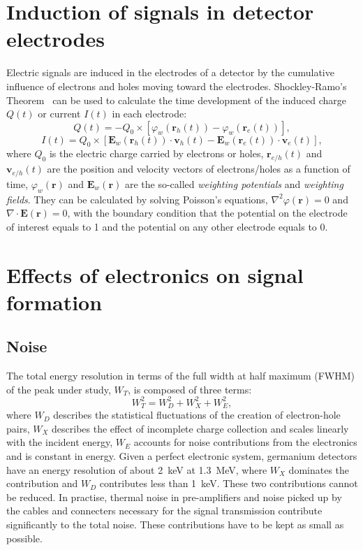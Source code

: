 \section{Induction of signals in detector electrodes}
\label{sec:det:ramo}
Electric signals are induced in the electrodes of a detector by the cumulative influence of electrons and holes moving toward the electrodes. Shockley-Ramo's Theorem~\cite{Gat82, Rad88, He00} can be used to calculate the time development of the induced charge $Q(t)$ or current $I(t)$ in each electrode:
\begin{equation} 
  \label{eq:det:ramoq}
  Q(t) = -Q_{0} \times [\varphi_{w}(\mathbf{r}_{h}(t)) - \varphi_{w}(\mathbf{r}_{e}(t))],
\end{equation}
\begin{equation} 
  \label{eq:det:ramoi}
  I(t) = Q_{0} \times [\mathbf{E}_{w}(\mathbf{r}_{h}(t)) \cdot \mathbf{v}_{h}(t) - \mathbf{E}_{w}(\mathbf{r}_{e}(t)) \cdot \mathbf{v}_{e}(t)],
\end{equation}
where $Q_{0}$ is the electric charge carried by electrons or holes, $\mathbf{r}_{e/h}(t)$ and $\mathbf{v}_{e/h}(t)$ are the position and velocity vectors of electrons/holes as a function of time, $\varphi_{w}(\mathbf{r})$ and $\mathbf{E}_{w}(\mathbf{r})$ are the so-called \emph{weighting potentials} and \emph{weighting fields}. They can be calculated by solving Poisson's equations, $\nabla^{2} \varphi(\mathbf{r}) = 0$ and $\nabla \cdot \mathbf{E}(\mathbf{r}) = 0$, with the boundary condition that the potential on the electrode of interest equals to 1 and the potential on any other electrode equals to 0.

\section{Effects of electronics on signal formation}
\label{sec:det:elec}

\subsection{Noise}
\label{sec:det:noise}
The total energy resolution in terms of the full width at half maximum
(FWHM) of the peak under study, $W_{T}$, is composed of three terms:
\begin{equation}
W_{T}^{2} = W_{D}^{2} + W_{X}^{2} + W_{E}^{2},
\end{equation}
where $W_{D}$ describes the statistical fluctuations of the creation of electron-hole pairs, $W_{X}$ describes the effect of incomplete charge collection and scales linearly with the incident energy, $W_{E}$ accounts for noise contributions from the electronics and is constant in energy. Given a perfect electronic system, germanium detectors have an energy resolution of about 2~keV at 1.3~MeV, where $W_{X}$ dominates the contribution and $W_{D}$ contributes less than 1~keV. These two contributions cannot be reduced. In practise, thermal noise in pre-amplifiers and noise picked up by the cables and connecters necessary for the signal transmission contribute significantly to the total noise. These contributions have to be kept as small as possible.

